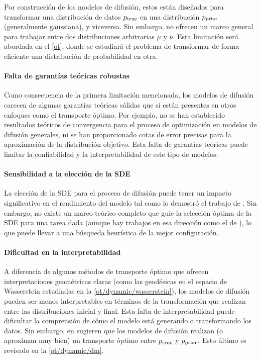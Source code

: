 Por construcción de los modelos de difusión, estos están diseñados para transformar una distribución de datos $p_{\operatorname{true}}$ en una distribución $p_{\operatorname{prior}}$ (generalmente gaussiana), y viceversa. Sin embargo, no ofrecen un marco general para trabajar entre dos distribuciones arbitrarias $\mu$ y $\nu$. Esta limitación será abordada en el \autoref{ot}, donde se estudiará el problema de transformar de forma eficiente una distribución de probabilidad en otra.

\paragraph{Falta de garantías teóricas robustas}

Como consecuencia de la primera limitación mencionada, los modelos de difusión carecen de algunas garantías teóricas sólidas que sí están presentes en otros enfoques como el transporte óptimo. Por ejemplo, no se han establecido resultados teóricos de convergencia para el proceso de optimización en modelos de difusión generales, ni se han proporcionado cotas de error precisas para la aproximación de la distribución objetivo. Esta falta de garantías teóricas puede limitar la confiabilidad y la interpretabilidad de este tipo de modelos.

\paragraph{Sensibilidad a la elección de la SDE}

La elección de la SDE para el proceso de difusión puede tener un impacto significativo en el rendimiento del modelo tal como lo demostró el trabajo de \cite{song2021scorebased}. Sin embargo, no existe un marco teórico completo que guíe la selección óptima de la SDE para una tarea dada (aunque hay trabajos en esa dirección como el de \cite{karras2022elucidatingdesignspacediffusionbased}), lo que puede llevar a una búsqueda heurística de la mejor configuración.

\paragraph{Dificultad en la interpretabilidad}
A diferencia de algunos métodos de transporte óptimo que ofrecen interpretaciones geométricas claras (como las geodésicas en el espacio de Wasserstein estudiadas en la \autoref{ot/dynamic/wasserstein}), los modelos de difusión pueden ser menos interpretables en términos de la transformación que realizan entre las distribuciones inicial y final. Esta falta de interpretabilidad puede dificultar la comprensión de cómo el modelo está generando o transformando los datos. Sin embargo, en \cite{khrulkov2022understandingddpmlatentcodes} sugieren que los modelos de difusión realizan (o aproximan muy bien) un transporte óptimo entre $p_{\operatorname{true}}$ y $p_{\operatorname{prior}}$. Esto último es revisado en la \autoref{ot/dynamic/dm}.

